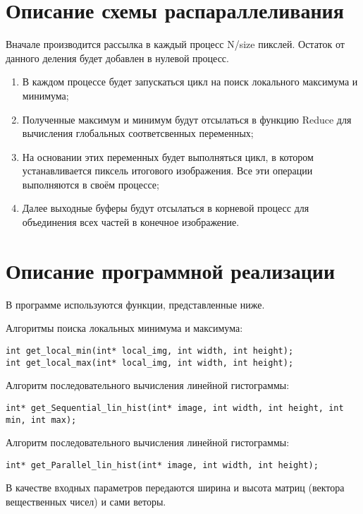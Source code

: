\documentclass{report}
\begin{document}
\section*{Описание схемы распараллеливания}
\par Вначале производится рассылка в каждый процесс N/size пикслей. Остаток от данного деления будет добавлен в нулевой процесс. \\
\begin{enumerate} 
    \item В каждом процессе будет запускаться цикл на поиск локального максимума и минимума; 
    \item Полученные максимум и минимум будут отсылаться в функцию Reduce для вычисления глобальных соответсвенных переменных; 
    \item На основании этих переменных будет выполняться цикл, в котором устанавливается пиксель итогового изображения. Все эти операции выполняются в своём процессе;
    \item Далее выходные буферы будут отсылаться в корневой процесс для объединения всех частей в конечное изображение.
\end{enumerate}
\newpage

\section*{Описание программной реализации}
В программе используются функции, представленные ниже.
\par Алгоритмы поиска локальных минимума и максимума:
\begin{lstlisting}
int get_local_min(int* local_img, int width, int height);
int get_local_max(int* local_img, int width, int height);
\end{lstlisting}
 
\par Алгоритм последовательного вычисления линейной гистограммы:
\begin{lstlisting}
int* get_Sequential_lin_hist(int* image, int width, int height, int min, int max);
\end{lstlisting}
\par Алгоритм последовательного вычисления линейной гистограммы:
\begin{lstlisting}
int* get_Parallel_lin_hist(int* image, int width, int height);
\end{lstlisting}
\par В качестве входных параметров передаются ширина и высота матриц (вектора вещественных чисел) и сами веторы.
\newpage
\end{document}
